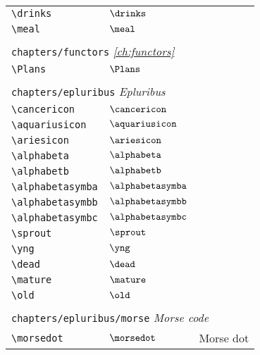 \begin{longtable}{lll}
 {\color[rgb]{0.5,0.5,0.5}\texttt{\textbackslash drinks}} & $\drinks$ & \\ 
 {\color[rgb]{0.5,0.5,0.5}\texttt{\textbackslash meal}} & $\meal$ & \\ 
  &  & \\ 
 \multicolumn{3}{l}{{\color[rgb]{0.5,0.5,0.5}\texttt{chapters/functors}} \emph{\cref{ch:functors}}}\\ 
 \hline
{\color[rgb]{0.5,0.5,0.5}\texttt{\textbackslash Plans}} & $\Plans$ & \\ 
  &  & \\ 
 \multicolumn{3}{l}{{\color[rgb]{0.5,0.5,0.5}\texttt{chapters/epluribus}} \emph{Epluribus}}\\ 
 \hline
{\color[rgb]{0.5,0.5,0.5}\texttt{\textbackslash cancericon}} & $\cancericon$ & \\ 
 {\color[rgb]{0.5,0.5,0.5}\texttt{\textbackslash aquariusicon}} & $\aquariusicon$ & \\ 
 {\color[rgb]{0.5,0.5,0.5}\texttt{\textbackslash ariesicon}} & $\ariesicon$ & \\ 
 {\color[rgb]{0.5,0.5,0.5}\texttt{\textbackslash alphabeta}} & $\alphabeta$ & \\ 
 {\color[rgb]{0.5,0.5,0.5}\texttt{\textbackslash alphabetb}} & $\alphabetb$ & \\ 
 {\color[rgb]{0.5,0.5,0.5}\texttt{\textbackslash alphabetasymba}} & $\alphabetasymba$ & \\ 
 {\color[rgb]{0.5,0.5,0.5}\texttt{\textbackslash alphabetasymbb}} & $\alphabetasymbb$ & \\ 
 {\color[rgb]{0.5,0.5,0.5}\texttt{\textbackslash alphabetasymbc}} & $\alphabetasymbc$ & \\ 
 {\color[rgb]{0.5,0.5,0.5}\texttt{\textbackslash sprout}} & $\sprout$ & \\ 
 {\color[rgb]{0.5,0.5,0.5}\texttt{\textbackslash yng}} & $\yng$ & \\ 
 {\color[rgb]{0.5,0.5,0.5}\texttt{\textbackslash dead}} & $\dead$ & \\ 
 {\color[rgb]{0.5,0.5,0.5}\texttt{\textbackslash mature}} & $\mature$ & \\ 
 {\color[rgb]{0.5,0.5,0.5}\texttt{\textbackslash old}} & $\old$ & \\ 
  &  & \\ 
 \multicolumn{3}{l}{{\color[rgb]{0.5,0.5,0.5}\texttt{chapters/epluribus/morse}} \emph{Morse code}}\\ 
 \hline
{\color[rgb]{0.5,0.5,0.5}\texttt{\textbackslash morsedot}} & $\morsedot$ &  Morse dot\\ 

\end{longtable}
